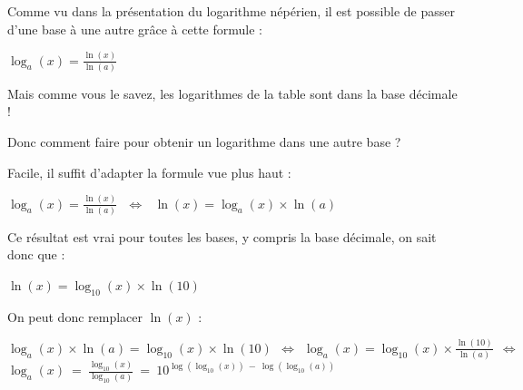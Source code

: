\documentclass[a4paper, twoside]{article}
\begin{document}
	Comme vu dans la présentation du logarithme népérien, il est possible de passer d'une base à une autre grâce à cette formule : 
	\begin{center}
	\begin{LARGE}

		$ \log_a (x) = \frac{\ln (x)}{\ln (a)}$ 
		
	\end{LARGE}
	\end{center}

	\begin{center}
	Mais comme vous le savez, les logarithmes de la table sont dans la base décimale !

	Donc comment faire pour obtenir un logarithme dans une autre base ?
	\end{center}

	Facile, il suffit d'adapter la formule vue plus haut :

	\vspace{0.1cm}

	\begin{large}
	\begin{center}
		$ \log_a (x) = \frac{\ln (x)}{\ln (a)} ~~~ \Longleftrightarrow ~~~ \ln (x) = \log_a (x) \times \ln (a)$\\ 

	\end{center}
	\end{large}

	Ce résultat est vrai pour toutes les bases, y compris la base décimale, on sait donc que :

	\vspace{0.1cm}

	\begin{large}
	\begin{center}

		$ \ln (x) = \log_{10} (x) \times \ln (10)$\\ 
		
	\end{center}
	\end{large}

	On peut donc remplacer $\ln (x)$ :

	\begin{LARGE}
	\begin{center}

		{\large $ \log_a (x) \times \ln (a) = \log_{10} (x) \times \ln (10) ~~ \Longleftrightarrow ~~ \log_a (x) = \log_{10} (x) \times \frac{\ln(10)}{\ln(a)} ~~ \Longleftrightarrow $ }\\
		\vspace{0.2cm}
		$\log_a (x) ~ = ~ \frac{\log_{10} (x)}{\log_{10} (a)} ~ = ~ 10^{\log(\log_{10} (x))~-~\log(\log_{10} (a))}$\\ 
		
	\end{center}
	\end{LARGE} 
\end{document}
